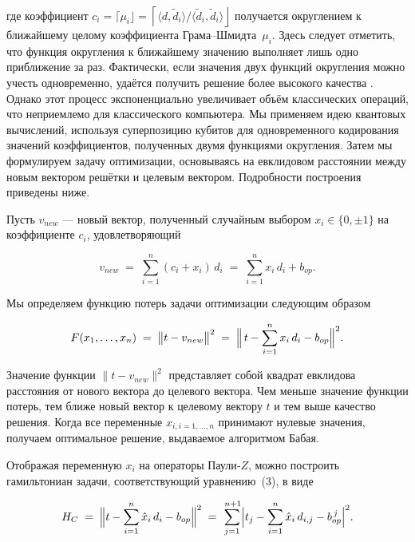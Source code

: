 где коэффициент $c_i=\lceil\mu_i\rfloor=
\left\lceil\langle{d},\widetilde{d}_i\rangle/
\langle\widetilde{d}_i,\widetilde{d}_i\rangle\right\rfloor$ получается
округлением к ближайшему целому коэффициента Грама–Шмидта~$\mu_i$. Здесь
следует отметить, что функция округления к ближайшему значению выполняет лишь
одно приближение за раз. Фактически, если значения двух функций округления
можно учесть одновременно, удаётся получить решение более высокого качества
\cite{cite_31}. Однако этот процесс экспоненциально увеличивает объём
классических операций, что неприемлемо для классического компьютера. Мы
применяем идею квантовых вычислений, используя суперпозицию кубитов для
одновременного кодирования значений коэффициентов, полученных двумя функциями
округления. Затем мы формулируем задачу оптимизации, основываясь на евклидовом
расстоянии между новым вектором решётки и целевым вектором. Подробности
построения приведены ниже.

Пусть $v_{new}$ — новый вектор, полученный случайным выбором $x_i\in\{0,\pm1\}$
на коэффициенте $c_i$, удовлетворяющий

\begin{equation}
    v_{new}
    \;=\;
    \sum_{i=1}^{n} (c_i + x_i)\,d_i
    \;=\;
    \sum_{i=1}^{n} x_i\,d_i + b_{op}.
\end{equation}

Мы определяем функцию потерь задачи оптимизации следующим образом

\begin{equation}
    F(x_{1},\ldots,x_{n})
    \;=\;
    \bigl\lVert t - v_{new} \bigr\rVert^{2}
    \;=\;
    \Bigl\lVert\,
        t - \sum_{i=1}^{n} x_i\,d_i - b_{op}
    \Bigr\rVert^{2}.
\end{equation}

Значение функции $\lVert t-v_{new}\rVert^{2}$ представляет собой квадрат
евклидова расстояния от нового вектора до целевого вектора. Чем меньше значение
функции потерь, тем ближе новый вектор к целевому вектору $t$ и тем выше
качество решения. Когда все переменные $x_{i,i=1,\ldots,n}$ принимают нулевые
значения, получаем оптимальное решение, выдаваемое алгоритмом Бабая.

Отображая переменную $x_i$ на операторы Паули‑$Z$, можно построить гамильтониан
задачи, соответствующий уравнению (3), в виде

\begin{equation}
    H_{C}
    \;=\;
    \Bigl\lVert
        t - \sum_{i=1}^{n} \hat{x}_{i}\,d_{i} - b_{op}
    \Bigr\rVert^{2}
    \;=\;
    \sum_{j=1}^{\,n+1}
    \Bigl|
    t_{j}
    - \sum_{i=1}^{n} \hat{x}_{i}\,d_{i,j}
    - b_{op}^{\,j}
    \Bigr|^{2}.
\end{equation}

